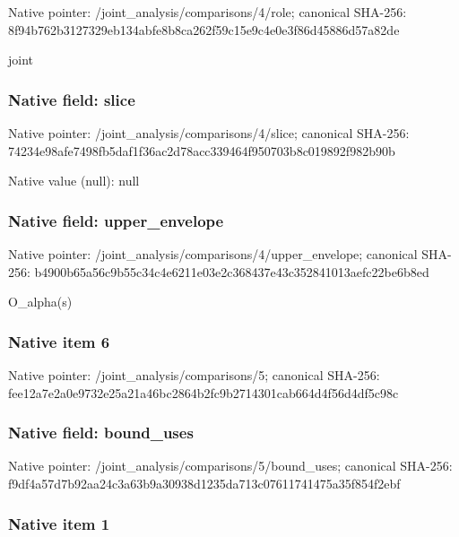 \documentclass[10pt,a4paper]{article}
\begin{document}
Native pointer: /joint\_analysis/comparisons/4/role; canonical SHA-256: 8f94b762b3127329eb134abf\allowbreak{}e8b8ca262f59c15e9c4e0e3f\allowbreak{}86d45886d57a82de


joint


\subsubsection{Native field: slice}


Native pointer: /joint\_analysis/comparisons/4/slice; canonical SHA-256: 74234e98afe7498fb5daf1f3\allowbreak{}6ac2d78acc339464f950703b\allowbreak{}8c019892f982b90b



Native value (null): null



\subsubsection{Native field: upper\_envelope}


Native pointer: /joint\_analysis/comparis\allowbreak{}ons/4/upper\_envelope; canonical SHA-256: b4900b65a56c9b55c34c4e62\allowbreak{}11e03e2c368437e43c352841\allowbreak{}013aefc22be6b8ed


O\_alpha(s)


\subsubsection{Native item 6}


Native pointer: /joint\_analysis/comparisons/5; canonical SHA-256: fee12a7e2a0e9732e25a21a4\allowbreak{}6bc2864b2fc9b2714301cab6\allowbreak{}64d4f56d4df5c98c



\subsubsection{Native field: bound\_uses}


Native pointer: /joint\_analysis/comparis\allowbreak{}ons/5/bound\_uses; canonical SHA-256: f9df4a57d7b92aa24c3a63b9\allowbreak{}a30938d1235da713c0761174\allowbreak{}1475a35f854f2ebf



\subsubsection{Native item 1}
\end{document}
